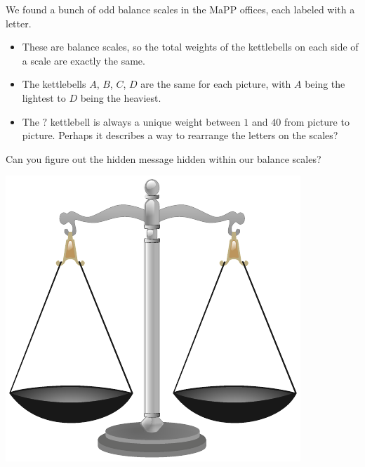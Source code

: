 


We found a bunch of odd balance scales in the MaPP offices,
each labeled with a letter.

  \begin{itemize}
  \item These are balance scales, so the total weights of the kettlebells
        on each side of a scale are exactly the same.
  \item The kettlebells $A$, $B$, $C$, $D$ are the same for each picture,
        with $A$ being the lightest to $D$ being the heaviest.
  \item The $?$ kettlebell is always a unique weight between $1$ and $40$ from
        picture to picture. Perhaps it describes a way
        to rearrange the letters on the scales?
  \end{itemize}

\noindent
Can you figure out the hidden message hidden within our balance scales?

\begin{center}
\includegraphics[width=0.6\linewidth]{assets/balancing-act/balanceScale.pdf}
\end{center}


  \begin{center}
    \phLetterBox{}{}
    \phLetterBox{}{}
    \phLetterBox{}{}
    \phLetterBox{}{}
    \phLetterBox{}{}
    \phLetterBox{}{}
    \hspace{3em}
    \phLetterBox{}{}
    \phLetterBox{}{}
    \phLetterBox{}{}
    \phLetterBox{}{}
    \phLetterBox{}{}
    \phLetterBox{}{}
  \end{center}



